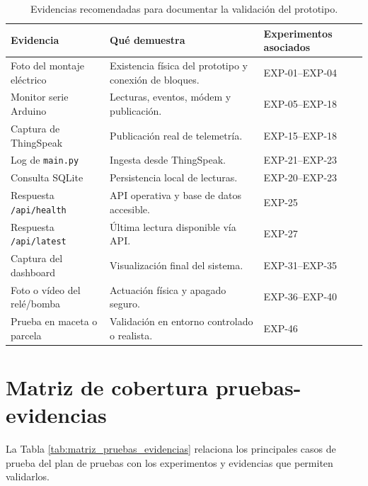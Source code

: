 \begin{table}[H]
\centering
\renewcommand{\arraystretch}{1.25}
\small
\begin{tabular}{|p{}|p{}|p{}|}
\hline
\rowcolor{gray!20}
\textbf{Evidencia} & \textbf{Qué demuestra} & \textbf{Experimentos asociados} \\
\hline
Foto del montaje eléctrico & Existencia física del prototipo y conexión de bloques. & EXP-01--EXP-04 \\
\hline
Monitor serie Arduino & Lecturas, eventos, módem y publicación. & EXP-05--EXP-18 \\
\hline
Captura de ThingSpeak & Publicación real de telemetría. & EXP-15--EXP-18 \\
\hline
Log de \texttt{main.py} & Ingesta desde ThingSpeak. & EXP-21--EXP-23 \\
\hline
Consulta SQLite & Persistencia local de lecturas. & EXP-20--EXP-23 \\
\hline
Respuesta \texttt{/api/health} & API operativa y base de datos accesible. & EXP-25 \\
\hline
Respuesta \texttt{/api/latest} & Última lectura disponible vía API. & EXP-27 \\
\hline
Captura del dashboard & Visualización final del sistema. & EXP-31--EXP-35 \\
\hline
Foto o vídeo del relé/bomba & Actuación física y apagado seguro. & EXP-36--EXP-40 \\
\hline
Prueba en maceta o parcela & Validación en entorno controlado o realista. & EXP-46 \\
\hline
\end{tabular}
\caption{Evidencias recomendadas para documentar la validación del prototipo.}
\label{tab:evidencias_recomendadas}
\end{table}

\section{Matriz de cobertura pruebas-evidencias}

La Tabla \ref{tab:matriz_pruebas_evidencias} relaciona los principales casos de prueba del plan de pruebas con los experimentos y evidencias que permiten validarlos.

